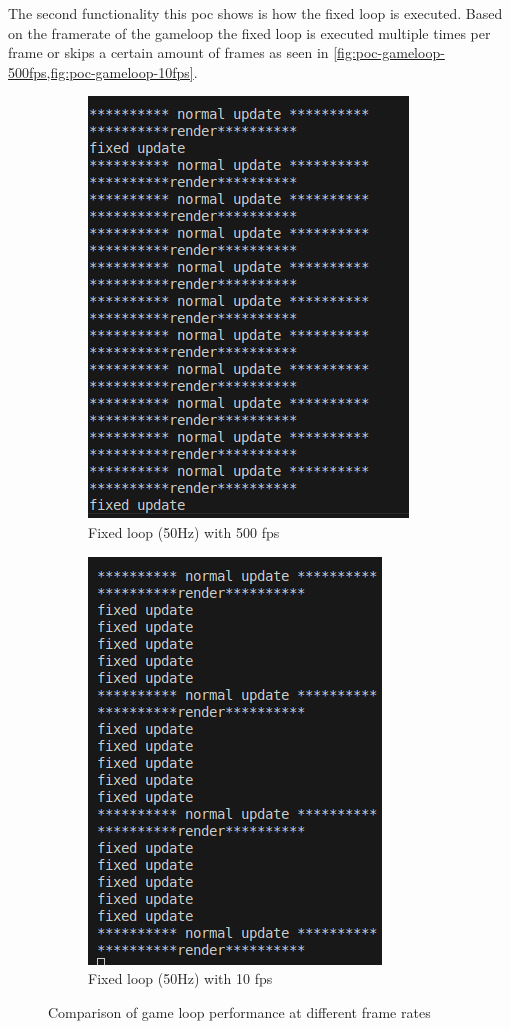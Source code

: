 \documentclass{projdoc}
\begin{document}
The second functionality this \gls{poc} shows is how the fixed loop is executed.
Based on the framerate of the gameloop the fixed loop is executed multiple times per
frame or skips a certain amount of frames as seen in
\cref{fig:poc-gameloop-500fps,fig:poc-gameloop-10fps}.

\begin{figure}
	\centering
	\begin{subfigure}[b]{0.45\textwidth}
		\centering
		\includegraphics[scale=0.5]{img/gameloop-console.png}
		\caption{Fixed loop (50Hz) with 500 fps}
		\label{fig:poc-gameloop-500fps}
	\end{subfigure}
	\hfill
	\begin{subfigure}[b]{0.45\textwidth}
		\centering
		\includegraphics[scale=0.5]{img/gameloop-console-10.png}
		\caption{Fixed loop (50Hz) with 10 fps}
		\label{fig:poc-gameloop-10fps}
	\end{subfigure}
	\caption{Comparison of game loop performance at different frame rates}
	\label{fig:poc-gameloop-console-comparison}
\end{figure}
\end{document}
